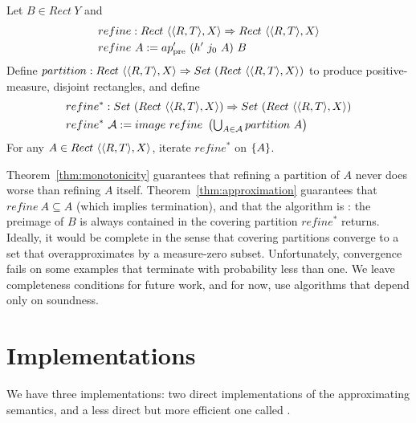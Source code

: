 \documentclass{llncs}
\newcommand{\pre}{_\mathrm{pre}}
\begin{document}
\begin{definition}
\label{def:preimage-refinement}
Let $B \in Rect~Y$ and
\begin{equation}
\begin{aligned}
	&refine : Rect~\pair{\pair{R,T},X} \tto Rect~\pair{\pair{R,T},X} \\
	&refine~A := ap\pre'~(h'~j_0~A)~B
\end{aligned}
\end{equation}
Define $partition : Rect~\langle{\langle{R,T}\rangle,X}\rangle \Rightarrow Set~(Rect~\langle{\langle{R,T}\rangle,X}\rangle)$ to produce positive-measure, disjoint rectangles, and define
\begin{equation}
\begin{aligned}
	&refine^* : Set~(Rect~\langle{\langle{R,T}\rangle,X}\rangle) \Rightarrow Set~(Rect~\langle{\langle{R,T}\rangle,X}\rangle) \\
	&refine^*~\mathcal{A} := image~refine~\left(\textstyle\bigcup_{A \in \mathcal{A}} partition~A \right)
\end{aligned}
\end{equation}
For any $A \in Rect~\langle{\langle{R,T}\rangle,X}\rangle$, iterate $refine^*$ on $\{{A}\}$.
\end{definition}

Theorem~\ref{thm:monotonicity} guarantees that refining a partition of $A$ never does worse than refining $A$ itself.
Theorem~\ref{thm:approximation} guarantees that $refine~A \subseteq A$ (which implies termination), and that the algorithm is : the preimage of $B$ is always contained in the covering partition $refine^*$ returns.
Ideally, it would be complete in the sense that covering partitions converge to a set that overapproximates by a measure-zero subset.
Unfortunately, convergence fails on some examples that terminate with probability less than one.
We leave completeness conditions for future work, and for now, use algorithms that depend only on soundness.


\section{Implementations}
\label{sec:implementation}

We have three implementations: two direct implementations of the approximating semantics, and a less direct but more efficient one called .
\end{document}
